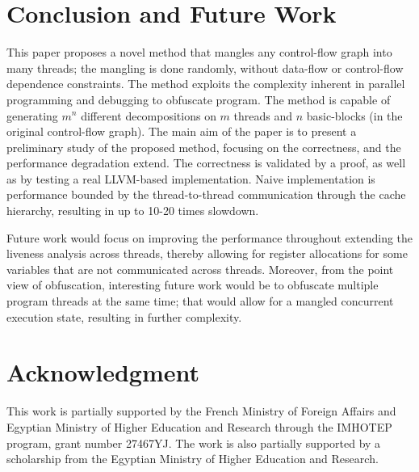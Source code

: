 \documentclass[3p,times,procedia,twocolumn,letterpaper]{elsarticle}
\begin{document}
\section{Conclusion and Future Work}
\label{conclusion}

This paper proposes a novel method that mangles any control-flow graph into many threads; the mangling is done randomly, without data-flow or control-flow dependence constraints. The method exploits the complexity inherent in parallel programming and debugging to obfuscate program. The method is capable of generating  $m^n$ different decompositions on $m$ threads and $n$ basic-blocks (in the original control-flow graph). The main aim of the paper is to present a preliminary study of the proposed method, focusing on the correctness, and the performance degradation extend. The correctness is validated by a proof, as well as by testing a real LLVM-based implementation. Naive implementation is  performance bounded by the thread-to-thread communication through the cache hierarchy, resulting in up to 10-20 times slowdown.

Future work would focus on improving the performance throughout extending the liveness analysis across threads, thereby allowing for register allocations for some variables that are not communicated across threads. Moreover, from the point view of obfuscation, interesting future work would be to obfuscate multiple program threads at the same time; that would allow for a mangled concurrent execution state, resulting in further complexity.

\section{Acknowledgment}
This work is partially supported by the French Ministry of Foreign
Affairs and Egyptian Ministry of Higher Education and Research through the
IMHOTEP program, grant number 27467YJ. The work is also partially supported by a scholarship from the Egyptian Ministry of Higher Education and Research.




\end{document}
